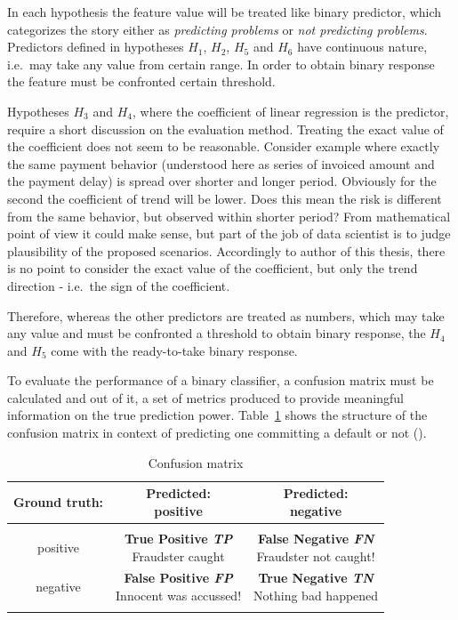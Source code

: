 \documentclass{article}
\begin{document}
In each hypothesis the feature value will be treated like binary predictor,
which categorizes the story either as \textit{predicting problems} or \textit{not predicting problems}.
Predictors defined in hypotheses $H_1$, $H_2$, $H_5$ and $H_6$ have continuous nature, i.e.\ may take any value from certain range.
In order to obtain binary response the feature must be confronted certain threshold.
\par Hypotheses $H_3$ and $H_4$, where the coefficient of linear regression is the predictor, require a short discussion on the evaluation method.
Treating the exact value of the coefficient does not seem to be reasonable.
Consider example where exactly the same payment behavior (understood here as series of invoiced amount and the payment delay) is spread over shorter and longer period.
Obviously for the second the coefficient of trend will be lower.
Does this mean the risk is different from the same behavior, but observed within shorter period?
From mathematical point of view it could make sense, but part of the job of data scientist is to judge plausibility of the proposed scenarios.
Accordingly to author of this thesis, there is no point to consider the exact value of the coefficient, but only the trend direction - i.e.\ the sign of the coefficient.
\par Therefore, whereas the other predictors are treated as numbers, which may take any value and must be confronted a threshold to obtain binary response,
the $H_4$ and $H_5$ come with the ready-to-take binary response.
\par To evaluate the performance of a binary classifier, a confusion matrix must be calculated and
out of it, a set of metrics produced to provide meaningful information on the true prediction power.
Table\ \ref {tab:305_confusion_matrix} shows the structure of the confusion matrix in context of predicting one committing a default or not (\cite{wiki-cm}).

\begin{table}[!htbp]
    \centering
    \caption{Confusion matrix}
    \label{tab:305_confusion_matrix}
    \begin{tabular}{c c c}
    \\ \hline\hline
    Ground truth: & \makecell{Predicted:\\positive} & \makecell{Predicted:\\negative} \\
    \hline \\
    positive & \makecell{\textbf{True Positive \textit{TP}} \\ Fraudster caught} & \makecell{\textbf{False Negative \textit{FN}} \\ Fraudster not caught!}\\
    negative & \makecell{\textbf{False Positive \textit{FP}} \\ Innocent was accussed!} & \makecell{\textbf{True Negative \textit{TN}} \\ Nothing bad happened}\\
    \hline\hline \\
    \end{tabular}
\end{table}
\end{document}
